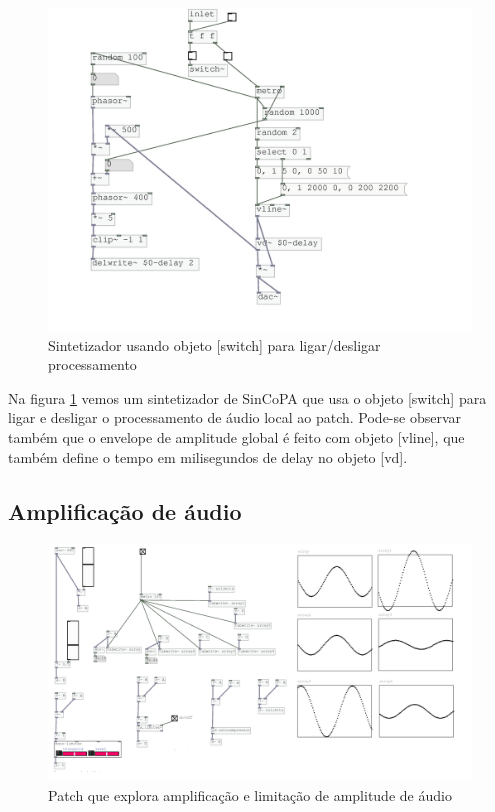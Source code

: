 \documentclass{ppgmus}
\begin{document}
\begin{figure}
\includegraphics[scale=.6]{switch}
\caption{Sintetizador usando objeto [switch\texttildelow] para ligar/desligar processamento}
\label{switch}
\end{figure}

Na figura \ref{switch} vemos um sintetizador de SinCoPA que usa o objeto [switch\texttildelow] para
ligar e desligar o processamento de áudio local ao patch. Pode-se observar também que o envelope
de amplitude global é feito com objeto [vline\texttildelow], que também define o tempo
em milisegundos de delay no objeto [vd\texttildelow].
 

\subsection{Amplificação de áudio}


\begin{figure}
\includegraphics[scale=.4]{limiter}
\caption{Patch que explora amplificação e limitação de amplitude de áudio}
\label{limiter}
\end{figure}
\end{document}
